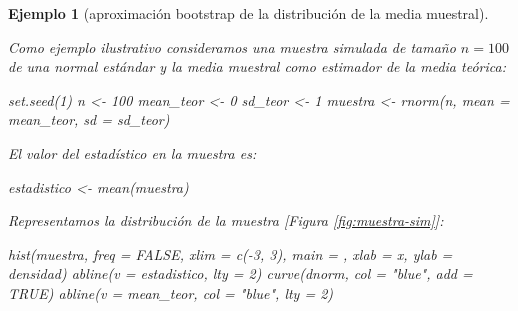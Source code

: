 \documentclass[
  10pt,
]{book}
\newenvironment{Shaded}{\begin{snugshade}}{\end{snugshade}}
\newcommand{\AttributeTok}[1]{\textcolor[rgb]{0.77,0.63,0.00}{#1}}
\newcommand{\ConstantTok}[1]{\textcolor[rgb]{0.00,0.00,0.00}{#1}}
\newcommand{\DecValTok}[1]{\textcolor[rgb]{0.00,0.00,0.81}{#1}}
\newcommand{\FunctionTok}[1]{\textcolor[rgb]{0.00,0.00,0.00}{#1}}
\newcommand{\NormalTok}[1]{#1}
\newcommand{\OtherTok}[1]{\textcolor[rgb]{0.56,0.35,0.01}{#1}}
\newcommand{\SpecialCharTok}[1]{\textcolor[rgb]{0.00,0.00,0.00}{#1}}
\newcommand{\StringTok}[1]{\textcolor[rgb]{0.31,0.60,0.02}{#1}}
\theoremstyle{break}
\newtheorem{example}{Ejemplo}[chapter]
\theoremstyle{nonumberplain}
\begin{document}
\begin{example}[aproximación bootstrap de la distribución de la media muestral]
\protect\hypertarget{exm:mean-boot}{}\label{exm:mean-boot}

Como ejemplo ilustrativo consideramos una muestra simulada de tamaño \(n=100\) de una normal estándar y la media muestral como estimador de la media teórica:

\begin{Shaded}
\begin{Highlighting}[]
\FunctionTok{set.seed}\NormalTok{(}\DecValTok{1}\NormalTok{)}
\NormalTok{n }\OtherTok{\textless{}{-}} \DecValTok{100}
\NormalTok{mean\_teor }\OtherTok{\textless{}{-}} \DecValTok{0}
\NormalTok{sd\_teor }\OtherTok{\textless{}{-}} \DecValTok{1}  
\NormalTok{muestra }\OtherTok{\textless{}{-}} \FunctionTok{rnorm}\NormalTok{(n, }\AttributeTok{mean =}\NormalTok{ mean\_teor, }\AttributeTok{sd =}\NormalTok{ sd\_teor)}
\end{Highlighting}
\end{Shaded}

El valor del estadístico en la muestra es:

\begin{Shaded}
\begin{Highlighting}[]
\NormalTok{estadistico }\OtherTok{\textless{}{-}} \FunctionTok{mean}\NormalTok{(muestra)}
\end{Highlighting}
\end{Shaded}

Representamos la distribución de la muestra {[}Figura \ref{fig:muestra-sim}{]}:

\begin{Shaded}
\begin{Highlighting}[]
\FunctionTok{hist}\NormalTok{(muestra, }\AttributeTok{freq =} \ConstantTok{FALSE}\NormalTok{, }\AttributeTok{xlim =} \FunctionTok{c}\NormalTok{(}\SpecialCharTok{{-}}\DecValTok{3}\NormalTok{, }\DecValTok{3}\NormalTok{),}
     \AttributeTok{main =} \StringTok{\textquotesingle{}\textquotesingle{}}\NormalTok{, }\AttributeTok{xlab =} \StringTok{\textquotesingle{}x\textquotesingle{}}\NormalTok{, }\AttributeTok{ylab =} \StringTok{\textquotesingle{}densidad\textquotesingle{}}\NormalTok{)}
\FunctionTok{abline}\NormalTok{(}\AttributeTok{v =}\NormalTok{ estadistico, }\AttributeTok{lty =} \DecValTok{2}\NormalTok{)}
\FunctionTok{curve}\NormalTok{(dnorm, }\AttributeTok{col =} \StringTok{"blue"}\NormalTok{, }\AttributeTok{add =} \ConstantTok{TRUE}\NormalTok{)}
\FunctionTok{abline}\NormalTok{(}\AttributeTok{v =}\NormalTok{ mean\_teor, }\AttributeTok{col =} \StringTok{"blue"}\NormalTok{, }\AttributeTok{lty =} \DecValTok{2}\NormalTok{)}
\end{Highlighting}
\end{Shaded}


\end{example}
\end{document}

